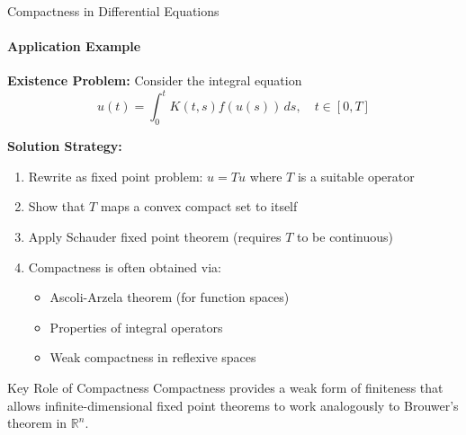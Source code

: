 \documentclass[aspectratio=169,10pt]{beamer}
\theoremstyle{definition}
\begin{document}
\begin{frame}{Compactness in Differential Equations}
\framesubtitle{Application Example}

\textbf{Existence Problem:} Consider the integral equation
\begin{equation*}
u(t) = \int_0^t K(t,s) f(u(s)) \, ds, \quad t \in [0,T]
\end{equation*}

\vspace{0.2cm}

\textbf{Solution Strategy:}
\begin{enumerate}
    \item Rewrite as fixed point problem: $u = Tu$ where $T$ is a suitable operator
    \item Show that $T$ maps a convex compact set to itself
    \item Apply Schauder fixed point theorem (requires $T$ to be continuous)
    \item Compactness is often obtained via:
    \begin{itemize}
        \item Ascoli-Arzela theorem (for function spaces)
        \item Properties of integral operators
        \item Weak compactness in reflexive spaces
    \end{itemize}
\end{enumerate}

\vspace{0.3cm}

\begin{block}{Key Role of Compactness}
Compactness provides a weak form of finiteness that allows infinite-dimensional fixed point theorems to work analogously to Brouwer's theorem in $\mathbb{R}^n$.
\end{block}
\end{frame}
\end{document}
